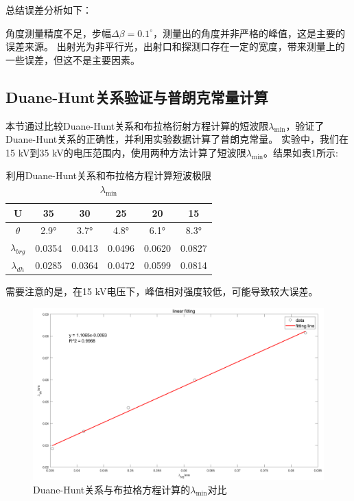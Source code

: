 \documentclass[11pt,a4paper]{article}
\begin{document}
    总结误差分析如下：
    
    角度测量精度不足，步幅$\Delta\beta=0.1^\circ$，测量出的角度并非严格的峰值，这是主要的误差来源。
    出射光为非平行光，出射口和探测口存在一定的宽度，带来测量上的一些误差，但这不是主要因素。

    \subsection{Duane-Hunt关系验证与普朗克常量计算}
本节通过比较Duane-Hunt关系和布拉格衍射方程计算的短波限$\lambda_{\min}$，验证了Duane-Hunt关系的正确性，并利用实验数据计算了普朗克常量。
实验中，我们在15 kV到35 kV的电压范围内，使用两种方法计算了短波限$\lambda_{\min}$。结果如表1所示:
\begin{table}[H]
 \centering
    \caption{利用Duane-Hunt关系和布拉格方程计算短波极限$\lambda_{\min}$}
    \begin{tabular}{|c|c|c|c|c|c|}
    \hline
    U         & 35     & 30     & 25     & 20     & 15     \\ \hline
    $\theta$     & 2.9°   & 3.7°   & 4.8°   & 6.1°   & 8.3°   \\ \hline
    $\lambda_{brg}$ & 0.0354 & 0.0413 & 0.0496 & 0.0620 & 0.0827 \\ \hline
    $\lambda_{dh}$  & 0.0285 & 0.0364 & 0.0472 & 0.0599 & 0.0814 \\ \hline
    \end{tabular}
    \end{table}
    需要注意的是，在15 kV电压下，峰值相对强度较低，可能导致较大误差。
    \begin{figure}[H]
    \centering
    \includegraphics[scale=0.5]{dh_brg.png}
    \captionsetup{font=footnotesize}
    \caption{Duane-Hunt关系与布拉格方程计算的$\lambda_{\min}$对比}
    \end{figure}
\end{document}
